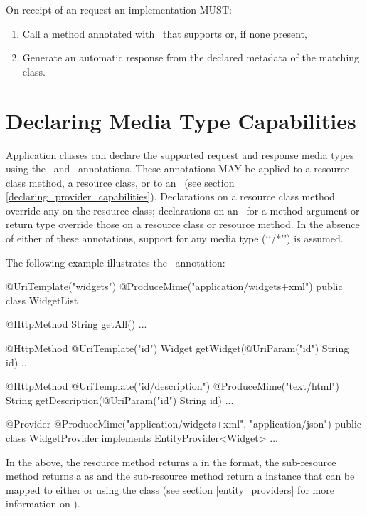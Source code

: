 On receipt of an  request an implementation MUST:

\begin{enumerate}
\item Call a method annotated with \HttpMethod\ that supports  or, if none present,
\item Generate an automatic response from the declared metadata of the matching class.
\end{enumerate}


\section{Declaring Media Type Capabilities}
\label{declaring_method_capabilities}

Application classes can declare the supported request and response media types using the \ProduceMime\ and \ConsumeMime\ annotations. These annotations MAY be applied to a resource class method, a resource class, or to an \EntityProvider\ (see section \ref{declaring_provider_capabilities}). Declarations on a resource class method override any on the resource class; declarations on an \EntityProvider\ for a method argument or return type override those on a resource class or resource method. In the absence of either of these annotations, support for any media type (\lq\lq*/*\rq\rq) is assumed.

The following example illustrates the \ProduceMime\ annotation:

\begin{listing}{1}
@UriTemplate("widgets")
@ProduceMime("application/widgets+xml")
public class WidgetList {
  
  @HttpMethod
  String getAll() {...}
  
  @HttpMethod
  @UriTemplate("{id}")
  Widget getWidget(@UriParam("id") String id) {...}

  @HttpMethod
  @UriTemplate("{id}/description")
  @ProduceMime("text/html")
  String getDescription(@UriParam("id") String id) {...}
}

@Provider
@ProduceMime({"application/widgets+xml", "application/json"})
public class WidgetProvider implements EntityProvider<Widget> {...}
\end{listing}

In the above, the  resource method returns a  in the  format, the  sub-resource method returns a  as  and the  sub-resource method return a  instance that can be mapped to either  or  using the  class (see section \ref{entity_providers} for more information on \EntityProvider).

